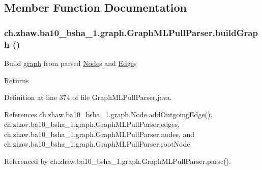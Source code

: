 \subsection{Member Function Documentation}
\hypertarget{classch_1_1zhaw_1_1ba10__bsha__1_1_1graph_1_1GraphMLPullParser_a5725aeb6453b75f4a0e7166bf4fe1023}{
\subsubsection[{buildGraph}]{ ch.zhaw.ba10\_\-bsha\_\-1.graph.GraphMLPullParser.buildGraph ()}}
\label{classch_1_1zhaw_1_1ba10__bsha__1_1_1graph_1_1GraphMLPullParser_a5725aeb6453b75f4a0e7166bf4fe1023}
Build \hyperlink{namespacech_1_1zhaw_1_1ba10__bsha__1_1_1graph}{graph} from parsed \hyperlink{classch_1_1zhaw_1_1ba10__bsha__1_1_1graph_1_1Node}{Node}s and \hyperlink{classch_1_1zhaw_1_1ba10__bsha__1_1_1graph_1_1Edge}{Edge}s

\begin{DoxyReturn}{Returns}

\end{DoxyReturn}


Definition at line 374 of file GraphMLPullParser.java.

References ch.zhaw.ba10\_\-bsha\_\-1.graph.Node.addOutgoingEdge(), ch.zhaw.ba10\_\-bsha\_\-1.graph.GraphMLPullParser.edges, ch.zhaw.ba10\_\-bsha\_\-1.graph.GraphMLPullParser.nodes, and ch.zhaw.ba10\_\-bsha\_\-1.graph.GraphMLPullParser.rootNode.

Referenced by ch.zhaw.ba10\_\-bsha\_\-1.graph.GraphMLPullParser.parse().

